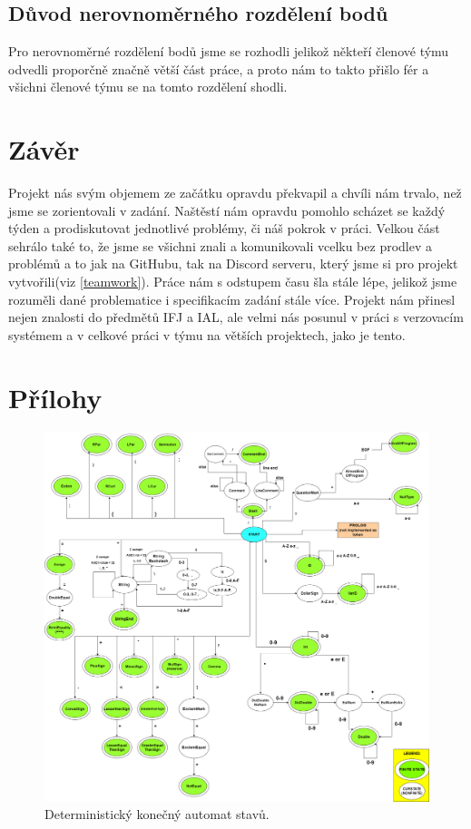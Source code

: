 \documentclass[a4paper, 12pt]{article}
\begin{document}
    \subsection{Důvod nerovnoměrného rozdělení bodů}
    Pro nerovnoměrné rozdělení bodů jsme se rozhodli jelikož někteří členové týmu odvedli proporčně značně větší část práce, a proto nám to takto přišlo fér a všichni členové týmu se na tomto rozdělení shodli.

    \section{Závěr}
    Projekt nás svým objemem ze začátku opravdu překvapil a chvíli nám trvalo, než jsme se zorientovali v zadání. Naštěstí nám opravdu pomohlo scházet se každý týden a prodiskutovat jednotlivé problémy, či náš pokrok v práci. Velkou část sehrálo také to, že jsme se všichni znali a komunikovali vcelku bez prodlev a problémů a to jak na GitHubu, tak na Discord serveru, který jsme si pro projekt vytvořili(viz \ref{teamwork}). Práce nám s odstupem času šla stále lépe, jelikož jsme rozuměli dané problematice i specifikacím zadání stále více. Projekt nám přinesl nejen znalosti do předmětů IFJ a IAL, ale velmi nás posunul v práci s verzovacím systémem a v celkové práci v týmu na větších projektech, jako je tento.
    \newpage
    \section{Přílohy}
    \begin{figure}[H]
        \includegraphics[width=\textwidth]{src/deterministicStateMachine_finall.png}
        \caption{Deterministický konečný automat stavů.}
        \label{Konecny automat}
    \end{figure}
\end{document}
